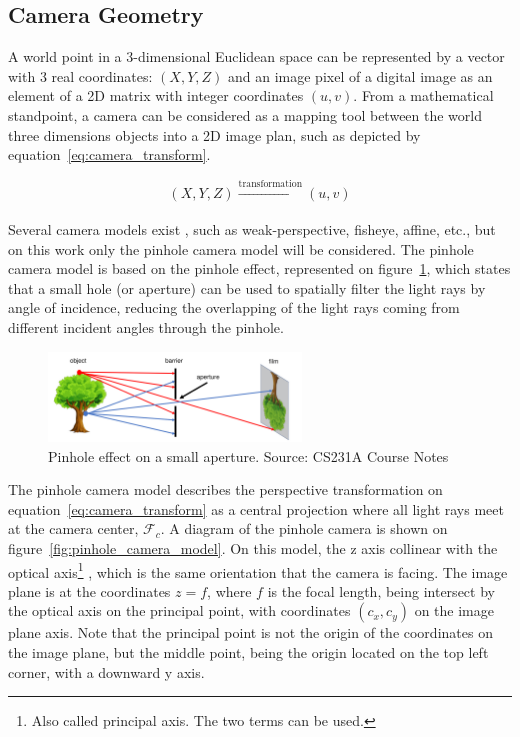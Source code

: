 \subsection{Camera Geometry}
A world point in a 3-dimensional Euclidean space can be represented by a vector with 3 real coordinates: $(X, Y, Z)$ and an image pixel of a digital image as an element of a 2D matrix with integer coordinates $(u, v)$. From a mathematical standpoint, a camera can be considered as a mapping tool between the world three dimensions objects into a 2D image plan, such as depicted by equation~\ref{eq:camera_transform}. 

\begin{equation}
	\label{eq:camera_transform}
	(X, Y, Z) \xrightarrow[]{\text{transformation}} (u, v)
\end{equation}

Several camera models exist \cite{camera_models, Sturm2010}, such as weak-perspective, fisheye, affine, etc., but on this work only the pinhole camera model will be considered. The pinhole camera model is based on the pinhole effect, represented on figure~\ref{fig:pinhole_effect}, which states that a small hole (or aperture) can be used to spatially filter the light rays by angle of incidence, reducing the overlapping of the light rays coming from different incident angles through the pinhole. 

\begin{figure}[H]
	\centering
	\includegraphics[width=0.6\textwidth]{img/camera/pnhole_effect.png}
	\caption{Pinhole effect on a small aperture. Source: CS231A Course Notes~\cite{camera_models}}
	\label{fig:pinhole_effect}
\end{figure}

The pinhole camera model describes the perspective transformation on equation~\ref{eq:camera_transform} as a central projection where all light rays meet at the camera center, $\mathcal{F}_c$. A diagram of the pinhole camera is shown on figure~\ref{fig:pinhole_camera_model}. On this model, the z axis collinear with the optical axis\footnote{Also called principal axis. The two terms can be used.} , which is the same orientation that the camera is facing. The image plane is at the coordinates $z = f$, where $f$ is the focal length, being intersect by the optical axis on the principal point, with coordinates $(c_x, c_y)$ on the image plane axis. Note that the principal point is not the origin of the coordinates on the image plane, but the middle point, being the origin located on the top left corner, with a downward y axis.

